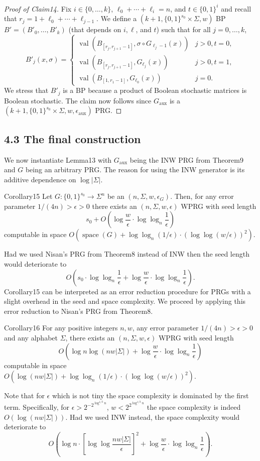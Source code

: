 \begin{proof}[Proof of Claim14]
Fix $i\in\{0,\ldots,k\}$, $\ell_0+\cdots+\ell_i=n$, and $t\in\{0,1\}^i$ and recall that $r_j=1+\ell_0+\cdots+\ell_{j-1}$. We define a $(k+1,\{0,1\}^{s_0}\times\Sigma,w)$ BP $B'=(B'_0,\ldots,B'_k)$ (that depends on $i,\ell$, and $t$) such that for all $j=0,\ldots,k$,
\begin{equation}\tag{12}B'_j(x,\sigma)=\begin{cases}\operatorname{val}(B_{[r_j,r_{j+1}-1]},\sigma\circ G_{\ell_j-1}(x))&j>0,t=0,\\\operatorname{val}(B_{[r_j,r_{j+1}-1]},G_{\ell_j}(x))&j>0,t=1,\\\operatorname{val}(B_{[1,r_1-1]},G_{\ell_0}(x))&j=0.\end{cases}\end{equation}
We stress that $B'_j$ is a BP because a product of Boolean stochastic matrices is Boolean stochastic. The claim now follows since $G_{\mathrm{aux}}$ is a $(k+1,\{0,1\}^{s_0}\times\Sigma,w,\epsilon_{\mathrm{aux}})$ PRG.
\end{proof}
\subsection*{4.3 The final construction}
We now instantiate Lemma13 with $G_{\mathrm{aux}}$ being the INW PRG from Theorem9 and $G$ being an arbitrary PRG. The reason for using the INW generator is its additive dependence on $\log|\Sigma|$.
\begin{authorclaim}{Corollary15}
Let $G:\{0,1\}^{s_0}\to\Sigma^n$ be an $(n,\Sigma,w,\epsilon_G)$. Then, for any error parameter $1/(4n)>\epsilon>0$ there exists an $(n,\Sigma,w,\epsilon)$ WPRG with seed length
\[s_0+O\left(\log\frac w\epsilon\cdot\log\log_n\frac1\epsilon\right)\]
computable in space $O(\operatorname{space}(G)+\log\log_n(1/\epsilon)\cdot(\log\log(w/\epsilon))^2)$.
\end{authorclaim}
Had we used Nisan's PRG from Theorem8 instead of INW then the seed length would deteriorate to
\[O\left(s_0\cdot\log\log_n\frac1\epsilon+\log\frac w\epsilon\cdot\log\log_n\frac1\epsilon\right).\]
Corollary15 can be interpreted as an error reduction procedure for PRGs with a slight overhead in the seed and space complexity. We proceed by applying this error reduction to Nisan's PRG from Theorem8.
\begin{authorclaim}{Corollary16}
For any positive integers $n,w$, any error parameter $1/(4n)>\epsilon>0$ and any alphabet $\Sigma$, there exists an $(n,\Sigma,w,\epsilon)$ WPRG with seed length
\[O\left(\log n\log(nw|\Sigma|)+\log\frac w\epsilon\cdot\log\log_n\frac1\epsilon\right)\]
computable in space $O(\log(nw|\Sigma|)+\log\log_n(1/\epsilon)\cdot(\log\log(w/\epsilon))^2)$.
\end{authorclaim}
Note that for $\epsilon$ which is not tiny the space complexity is dominated by the first term. Specifically, for $\epsilon>2^{-2^{\log^{1/3}n}}$, $w<2^{2^{\log^{1/3}n}}$ the space complexity is indeed $O(\log(nw|\Sigma|))$. Had we used INW instead, the space complexity would deteriorate to
\[O\left(\log n\cdot\left[\log\log\frac{nw|\Sigma|}\epsilon\right]^2+\log\frac w\epsilon\cdot\log\log_n\frac1\epsilon\right).\]
